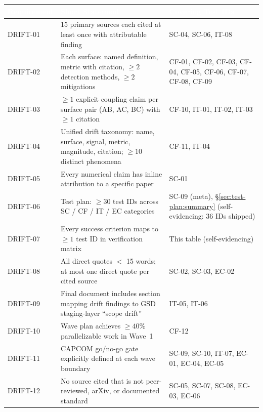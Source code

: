 \documentclass[11pt,letterpaper]{article}
\newcommand{\tableheader}[1]{\textbf{\sffamily\textcolor{white}{#1}}}
\begin{document}
\begin{center}
\small
\begin{tabularx}{\textwidth}{L{2.0cm}L{5.4cm}X}
\toprule
{}
\tableheader{Requirement} & \tableheader{Short Statement} & \tableheader{Covering Test IDs} \\
\midrule
DRIFT-01 & 15 primary sources each cited at least once with attributable finding & SC-04, SC-06, IT-08 \\
DRIFT-02 & Each surface: named definition, metric with citation, $\geq 2$ detection methods, $\geq 2$ mitigations & CF-01, CF-02, CF-03, CF-04, CF-05, CF-06, CF-07, CF-08, CF-09 \\
DRIFT-03 & $\geq 1$ explicit coupling claim per surface pair (AB, AC, BC) with $\geq 1$ citation & CF-10, IT-01, IT-02, IT-03 \\
DRIFT-04 & Unified drift taxonomy: name, surface, signal, metric, magnitude, citation; $\geq 10$ distinct phenomena & CF-11, IT-04 \\
DRIFT-05 & Every numerical claim has inline attribution to a specific paper & SC-01 \\
DRIFT-06 & Test plan: $\geq 30$ test IDs across SC / CF / IT / EC categories & SC-09 (meta), \S\ref{sec:test-plan:summary} (self-evidencing: 36 IDs shipped) \\
DRIFT-07 & Every success criterion maps to $\geq 1$ test ID in verification matrix & This table (self-evidencing) \\
DRIFT-08 & All direct quotes $<$ 15 words; at most one direct quote per cited source & SC-02, SC-03, EC-02 \\
DRIFT-09 & Final document includes section mapping drift findings to GSD staging-layer ``scope drift'' & IT-05, IT-06 \\
DRIFT-10 & Wave plan achieves $\geq 40\%$ parallelizable work in Wave~1 & CF-12 \\
DRIFT-11 & CAPCOM go/no-go gate explicitly defined at each wave boundary & SC-09, SC-10, IT-07, EC-01, EC-04, EC-05 \\
DRIFT-12 & No source cited that is not peer-reviewed, arXiv, or documented standard & SC-05, SC-07, SC-08, EC-03, EC-06 \\
\bottomrule
\end{tabularx}
\label{tab:verify-matrix}
\end{center}
\end{document}
